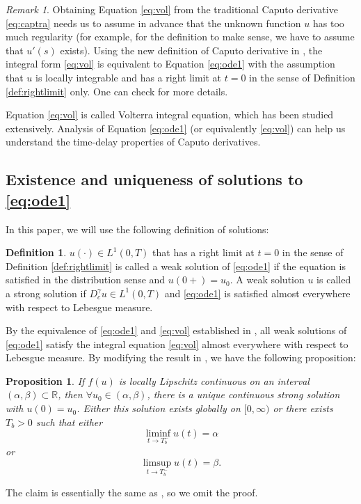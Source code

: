 \documentclass[12pt]{amsart}%
\newtheorem{pro}[thm]{Proposition}
\theoremstyle{definition}
\newtheorem{definition}[thm]{Definition}
\theoremstyle{remark}
\newtheorem{rmk}[thm]{Remark}
\begin{document}
\begin{rmk}
Obtaining Equation \eqref{eq:vol} from the traditional Caputo derivative \eqref{eq:captra} needs us to assume in advance that the unknown function $u$ has too much regularity (for example, for the definition to make sense, we have to assume that $u'(s)$ exists). Using the new definition of Caputo derivative in \cite{liliu16}, the integral form \eqref{eq:vol} is equivalent to Equation \eqref{eq:ode1}  with the assumption that $u$ is locally integrable and has a right limit at $t=0$ in the sense of Definition \ref{def:rightlimit} only. One can check \cite{df02, kst06, diethelm10,liliu16} for more details.
\end{rmk}

Equation \eqref{eq:vol} is called Volterra integral equation, which has been studied extensively.  Analysis of Equation \eqref{eq:ode1} (or equivalently \eqref{eq:vol}) can help us understand the time-delay properties of Caputo derivatives.


\subsection{Existence and uniqueness of solutions to \eqref{eq:ode1}}
In this paper, we will use the following definition of solutions:
\begin{definition}
$u(\cdot)\in L^1(0, T)$ that has a right limit at $t=0$ in the sense of Definition \ref{def:rightlimit} is called a weak solution of \eqref{eq:ode1} if the equation is satisfied in the distribution sense and $u(0+)=u_0$. A weak solution $u$ is called a strong solution if $D_c^{\gamma}u \in L^1(0, T)$ and \eqref{eq:ode1} is satisfied almost everywhere with respect to Lebesgue measure. 
\end{definition}
By the equivalence of \eqref{eq:ode1} and \eqref{eq:vol} established in \cite{liliu16}, all weak solutions of \eqref{eq:ode1} satisfy the integral equation \eqref{eq:vol} almost everywhere with respect to Lebesgue measure.
By modifying the result in \cite[Theorem 6]{liliu16}, we have the following proposition:
\begin{pro}\label{pro:exist}
If $f(u)$ is locally Lipschitz continuous on an interval $(\alpha, \beta)\subset \mathbb{R}$, then $\forall u_0\in (\alpha, \beta)$, there is a unique continuous strong solution with $u(0)=u_0$. Either this solution exists globally on $[0,\infty)$ or there exists $T_b>0$ such that either \[
\liminf_{t\to T_b^-}u(t)=\alpha 
\] 
or 
\[
\limsup_{t\to T_b^-}u(t)=\beta.
\]
\end{pro}
The claim is essentially the same as \cite[Theorem 6]{liliu16}, so we omit the proof.
\end{document}
